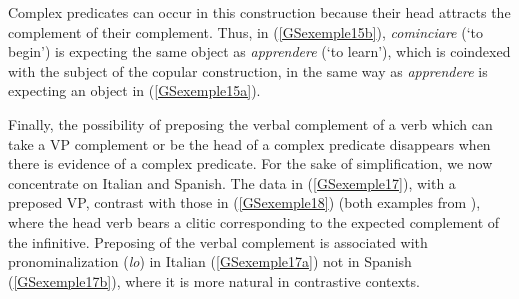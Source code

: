 \documentclass[output=paper
	        ,collection
	        ,collectionchapter
 	        ,biblatex
                ,babelshorthands
                ,newtxmath
                ,draftmode
                ,colorlinks, citecolor=brown
]{langscibook}
\begin{document}
{Complex predicates can occur in this construction because their head attracts the complement of their complement. Thus, in (\ref{GSexemple15b}), \emph{cominciare} (`to begin') is expecting the same object as \emph{apprendere} (`to learn'), which is coindexed with the subject of the copular construction, in the same way as \emph{apprendere} is expecting an object in (\ref{GSexemple15a}). 

Finally, the possibility of preposing the verbal complement of a verb which can take a VP complement or be the head of a complex predicate disappears when there is evidence of a complex predicate. For the sake of simplification, we now concentrate on Italian and Spanish. The data in (\ref{GSexemple17}), with a preposed VP, contrast with those in (\ref{GSexemple18}) (both examples from \citealt[132]{AG2010}), where the head verb bears a clitic corresponding to the expected complement of the infinitive. Preposing of the verbal complement is associated with pronominalization (\emph{lo}) in Italian (\ref{GSexemple17a}) not in Spanish (\ref{GSexemple17b}), where it is more natural in contrastive contexts.

\begin{exe}
	\label{GSexemple17} 
	\begin{xlist}
	\label{GSexemple17a}
		 
	\label{GSexemple17b}
	\end{xlist}
\end{exe}

\eal
	\label{GSexemple18} 
    \label{GSexemple18a} 	
	
	\label{GSexemple18b}
\zl

}
\end{document}
